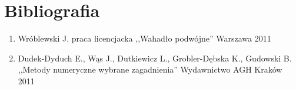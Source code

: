 \documentclass[11pt]{aghdpl}
\begin{document}
\clearpage
\section{Bibliografia}
\renewcommand*\labelenumi{[\theenumi]}

\begin{enumerate}
\item Wróblewski J. praca licencjacka ,,Wahadło podwójne'' Warszawa 2011 \label{bib_one}
\item Dudek-Dyduch E., Wąs J., Dutkiewicz L., Grobler-Dębska K., Gudowski B. ,,Metody numeryczne wybrane zagadnienia'' Wydawnictwo AGH Kraków 2011 \label{bib_two}

\end{enumerate}
\end{document}
